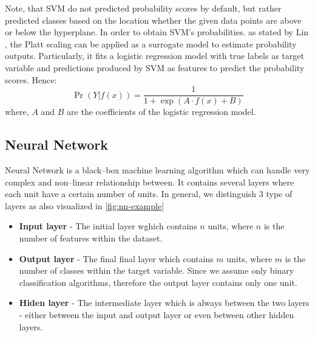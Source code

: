 Note, that SVM do not predicted probability scores by default, but rather predicted classes based on the location whether the given data points are above or below the hyperplane.
In order to obtain SVM's probabilities. as stated by Lin \citep{lin2007note}, the Platt scaling \citep{platt1999probabilistic} can be applied as a surrogate model to estimate probability outputs. Particularly, it fits a logistic regression model with true labels as target variable and predictions produced by SVM as features to predict the probability scores.
Hence:
\begin{equation}
    \operatorname{Pr}\left(Y | f(x) \right) = \frac{1}{1 + \exp\left(A \cdot f(x) + B \right)} 
\end{equation}
where, $A$ and $B$ are the coefficients of the logistic regression model.

\subsection{Neural Network}
\label{subssec:nn}
Neural Network is a black--box machine learning algorithm which can handle very complex and non--linear relationship between. It contains several layers where each unit have a certain number of units. In general, we distinguish 3 type of layers as also visualized in \autoref{fig:nn-example}
\begin{itemize}\setlength\itemsep{0em}
    \item \textbf{Input layer} - The initial layer wghich contains $n$ units, where $n$ is the number of features within the dataset.
    \item \textbf{Output layer} - The final final layer which contains $m$ units, where $m$ is the number of classes within the target variable. Since we assume only binary classification algorithms, therefore the output layer contains only one unit.
    \item \textbf{Hiden layer} - The intermediate layer which is always between the two layers - either between the input and output layer or even between other hidden layers.
    \end{itemize}

